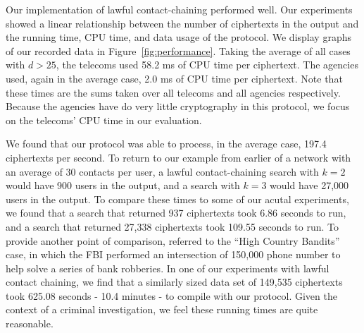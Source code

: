 \begin{figure*}[t]
\begin{subfigure}{0.66\columnwidth}
\centering
{}
\label{fig:data}
\end{subfigure}
\captionsetup{justification=centering}
\caption{Performance of Lawful Contact-Chaining}
\label{fig:performance}
\end{figure*}



Our implementation of lawful contact-chaining performed well. Our experiments showed a linear relationship between the number of ciphertexts in the output and the running time, CPU time, and data usage of the protocol. We display graphs of our recorded data in Figure~\ref{fig:performance}. Taking the average of all cases with $d>25$, the telecoms used 58.2 ms of CPU time per ciphertext. The agencies used, again in the average case, 2.0 ms of CPU time per ciphertext. Note that these times are the sums taken over all telecoms and all agencies respectively. Because the agencies have do very little cryptography in this protocol, we focus on the telecoms' CPU time in our evaluation. 

We found that our protocol was able to process, in the average case, 197.4 ciphertexts per second. To return to our example from earlier of a network with an average of 30 contacts per user, a lawful contact-chaining search with $k=2$ would have 900 users in the output, and a search with $k=3$ would have 27,000 users in the output. To compare these times to some of our acutal experiments, we found that a search that returned 937 ciphertexts took 6.86 seconds to run, and a search that returned 27,338 ciphertexts took 109.55 seconds to run. To provide another point of comparison, \cite{sff-foci2014} referred to the ``High Country Bandits'' case, in which the FBI performed an intersection of 150,000 phone number to help solve a series of bank robberies. In one of our experiments with lawful contact chaining, we find that a similarly sized data set of 149,535 ciphertexts took 625.08 seconds - 10.4 minutes - to compile with our protocol. Given the context of a criminal investigation, we feel these running times are quite reasonable. 

